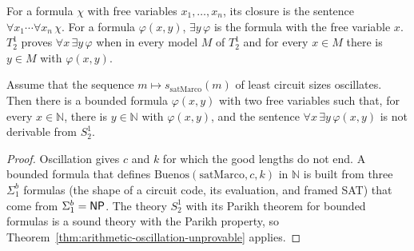 \begin{definition}
  \label{def:arithmetic-forall-exists}
  \leanok
  \own{}
  \infrastructure{}
  For a formula $\chi$ with free variables $x_1, \dots, x_n$, its closure is the sentence $\forall
  x_1 \cdots \forall x_n\, \chi$. For a formula $\varphi(x, y)$, $\exists y\, \varphi$ is the formula
  with the free variable $x$. $T^1_2$ proves $\forall x\, \exists y\, \varphi$ when in every model
  $M$ of $T^1_2$ and for every $x \in M$ there is $y \in M$ with $\varphi(x, y)$.
\end{definition}

\begin{theorem}
  \label{thm:arithmetic-s12-oscillation}
  \leanok
  Assume that the sequence $m \mapsto s_{\mathrm{satMarco}}(m)$ of least circuit sizes oscillates.
  Then there is a bounded formula $\varphi(x, y)$ with two free variables such that, for every $x \in
  \mathbb{N}$, there is $y \in \mathbb{N}$ with $\varphi(x, y)$, and the sentence $\forall x\,
  \exists y\, \varphi(x, y)$ is not derivable from $S^1_2$.
\end{theorem}

\begin{proof}
  \leanok
  Oscillation gives $c$ and $k$ for which the good lengths do not end. A bounded formula that defines
  $\mathrm{Buenos}(\mathrm{satMarco}, c, k)$ in $\mathbb{N}$ is built from three $\Sigma^b_1$ formulas
  (the shape of a circuit code, its evaluation, and framed SAT) that come from $\Sigma^b_1 = \mathsf{NP}$.
  The theory $S^1_2$ with its Parikh theorem for bounded formulas is a sound theory with the Parikh
  property, so Theorem~\ref{thm:arithmetic-oscillation-unprovable} applies.
\end{proof}

